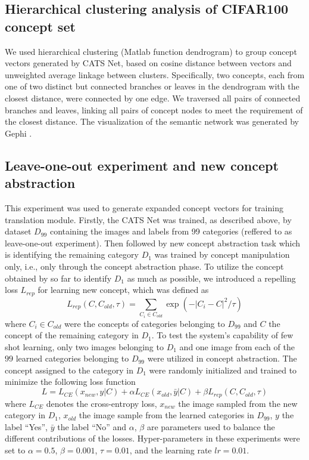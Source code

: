 \documentclass[pdflatex,sn-mathphys-num,lineno]{sn-jnl}%
\begin{document}
\begin{CJK}{UTF8}{gbsn}
\subsection{Hierarchical clustering analysis of CIFAR100 concept set}
We used hierarchical clustering  (Matlab function dendrogram) to group concept vectors generated by CATS Net, based on cosine distance between vectors and unweighted average linkage between clusters. Specifically, two concepts, each from one of two distinct but connected branches or leaves in the dendrogram with the closest distance, were connected by one edge. We traversed all pairs of connected branches and leaves, linking all pairs of concept nodes to meet the requirement of the closest distance. The visualization of the semantic network was generated by Gephi \cite{bastian_gephi_2009}.

\subsection{Leave-one-out experiment and new concept abstraction}
This experiment was used to generate expanded concept vectors for training translation module. Firstly, the CATS Net was trained, as described above, by dataset $D_{99}$ containing the images and labels from 99 categories (reffered to as leave-one-out experiment). Then followed by new concept abstraction task which is identifying the remaining category $D_1$ was trained by concept manipulation only, i.e., only through the concept abstraction phase. To utilize the concept obtained by so far to identify $D_1$ as much as possible, we introduced a repelling loss $L_{rep}$ for learning new concept, which was defined as
$$L_{rep}(C, C_{old}, \tau) = \sum_{C_i \in C_{old}} \exp (-|C_i - C|^2/\tau)$$
where $C_i \in C_{old}$ were the concepts of categories belonging to $D_{99}$ and $C$ the concept of the remaining category in $D_1$. To test the system’s capability of few shot learning, only two images belonging to $D_1$ and one image from each of the $99$ learned categories belonging to $D_{99}$ were utilized in concept abstraction. The concept assigned to the category in $D_1$ were randomly initialized and trained to minimize the following loss function
$$L = L_{CE}(x_{new},y|C) + \alpha L_{CE}(x_{old},\bar{y}|C) + \beta L_{rep}(C, C_{old}, \tau)$$
where $L_{CE}$ denotes the cross-entropy loss, $x_{new}$ the image sampled from the new category in $D_1$, $x_{old}$ the image sample from the learned categories in $D_{99}$, $y$ the label “Yes”, $\bar{y}$ the label “No” and $\alpha$, $\beta$ are parameters used to balance the different contributions of the losses. Hyper-parameters in these experiments were set to $\alpha = 0.5$, $\beta = 0.001$, $\tau = 0.01$, and the learning rate $ lr = 0.01$. 


\end{CJK}
\end{document}

